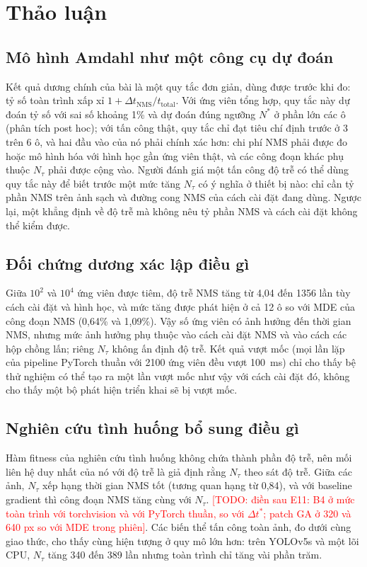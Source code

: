 \documentclass[12pt,a4paper]{article}
\newcommand{\todo}[1]{\textcolor{red}{[TODO: #1]}}
\newcommand{\Ntau}{N_{\tau}}
\begin{document}


\section{Thảo luận}
\label{sec:discussion}
\subsection{Mô hình Amdahl như một công cụ dự đoán}
Kết quả dương chính của bài là một quy tắc đơn giản, dùng được trước khi đo: tỷ số toàn trình xấp xỉ $1 + \Delta t_{\mathrm{NMS}}/t_{\mathrm{total}}$. Với ứng viên tổng hợp, quy tắc này dự đoán tỷ số với sai số khoảng 1\% và dự đoán đúng ngưỡng $N^{*}$ ở phần lớn các ô (phân tích post hoc); với tấn công thật, quy tắc chỉ đạt tiêu chí định trước ở 3 trên 6 ô, và hai đầu vào của nó phải chính xác hơn: chi phí NMS phải được đo hoặc mô hình hóa với hình học gần ứng viên thật, và các công đoạn khác phụ thuộc $\Ntau$ phải được cộng vào. Người đánh giá một tấn công độ trễ có thể dùng quy tắc này để biết trước một mức tăng $\Ntau$ có ý nghĩa ở thiết bị nào: chỉ cần tỷ phần NMS trên ảnh sạch và đường cong NMS của cách cài đặt đang dùng. Ngược lại, một khẳng định về độ trễ mà không nêu tỷ phần NMS và cách cài đặt không thể kiểm được.

\subsection{Đối chứng dương xác lập điều gì}
Giữa $10^2$ và $10^4$ ứng viên được tiêm, độ trễ NMS tăng từ 4,04 đến 1356 lần tùy cách cài đặt và hình học, và mức tăng được phát hiện ở cả 12 ô so với MDE của công đoạn NMS (0,64\% và 1,09\%). Vậy số ứng viên có ảnh hưởng đến thời gian NMS, nhưng mức ảnh hưởng phụ thuộc vào cách cài đặt NMS và vào cách các hộp chồng lấn; riêng $\Ntau$ không ấn định độ trễ. Kết quả vượt mốc (mọi lần lặp của pipeline PyTorch thuần với 2100 ứng viên đều vượt 100~ms) chỉ cho thấy bệ thử nghiệm có thể tạo ra một lần vượt mốc như vậy với cách cài đặt đó, không cho thấy một bộ phát hiện triển khai sẽ bị vượt mốc.

\subsection{Nghiên cứu tình huống bổ sung điều gì}
Hàm fitness của nghiên cứu tình huống không chứa thành phần độ trễ, nên mối liên hệ duy nhất của nó với độ trễ là giả định rằng $\Ntau$ theo sát độ trễ. Giữa các ảnh, $\Ntau$ xếp hạng thời gian NMS tốt (tương quan hạng từ 0,84), và với baseline gradient thì công đoạn NMS tăng cùng với $\Ntau$. \todo{điền sau E11: B4 ở mức toàn trình với torchvision và với PyTorch thuần, so với $\Delta t^{*}$; patch GA ở 320 và 640 px so với MDE trong phiên}. Các biến thể tấn công toàn ảnh, đo dưới cùng giao thức, cho thấy cùng hiện tượng ở quy mô lớn hơn: trên YOLOv5s và một lõi CPU, $\Ntau$ tăng 340 đến 389 lần nhưng toàn trình chỉ tăng vài phần trăm.
\end{document}
